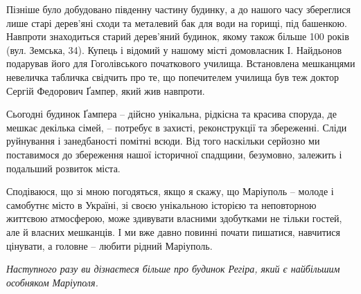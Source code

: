 Пізніше було добудовано південну частину будинку, а до нашого часу збереглися
лише старі дерев'яні сходи та металевий бак для води на горищі, під башенкою.
Навпроти знаходиться старий дерев'яний будинок, якому також більше 100 років
(вул. Земська, 34). Купець і відомий у нашому місті домовласник І. Найдьонов
подарував його для Гоголівського початкового училища. Встановлена мешканцями
невеличка табличка свідчить про те, що попечителем училища був теж доктор
Сергій Федорович Ґампер, який жив навпроти.

Сьогодні будинок Ґампера – дійсно унікальна, рідкісна та красива споруда, де
мешкає декілька сімей, – потребує в захисті, реконструкції та збереженні. Сліди
руйнування і занедбаності помітні всюди. Від того наскільки серйозно ми
поставимося до збереження нашої історичної спадщини, безумовно, залежить і
подальший розвиток міста.

Сподіваюся, що зі мною погодяться, якщо я скажу, що Маріуполь – молоде і
самобутнє місто в Україні, зі своєю унікальною історією та неповторною життєвою
атмосферою, може здивувати власними здобутками не тільки гостей, але й власних
мешканців. І ми вже давно повинні почати пишатися, навчитися цінувати, а
головне – любити рідний Маріуполь.

\emph{Наступного разу ви дізнаєтеся більше про будинок Регіра, який є найбільшим
особняком Маріуполя.}
